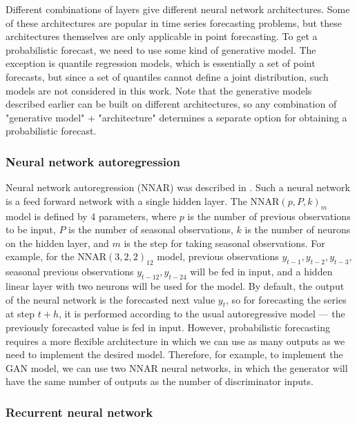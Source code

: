 \documentclass[12pt,a4paper]{article}
\begin{document}
Different combinations of layers give different neural network architectures. Some of these architectures are popular in time series forecasting problems, but these architectures themselves are only applicable in point forecasting. To get a probabilistic forecast, we need to use some kind of generative model. The exception is quantile regression models, which is essentially a set of point forecasts, but since a set of quantiles cannot define a joint distribution, such models are not considered in this work. Note that the generative models described earlier can be built on different architectures, so any combination of "generative model" + "architecture" determines a separate option for obtaining a probabilistic forecast.

\subsubsection{Neural network autoregression}

Neural network autoregression (NNAR) was described in \cite{fpp3}. Such a neural network is a feed forward network with a single hidden layer. The $\text{NNAR}(p,P,k)_m$ model is defined by 4 parameters, where $p$ is the number of previous observations to be input, $P$ is the number of seasonal observations, $k$ is the number of neurons on the hidden layer, and $m$ is the step for taking seasonal observations. For example, for the $\text{NNAR}(3, 2, 2)_{12}$ model, previous observations $y_{t-1}, y_{t-2}, y_{t-3}$, seasonal previous observations $y_{t-12}, y_{t-24}$ will be fed in input, and a hidden linear layer with two neurons will be used for the model. By default, the output of the neural network is the forecasted next value $y_t$, so for forecasting the series at step $t+h$, it is performed according to the usual autoregressive model — the previously forecasted value is fed in input. However, probabilistic forecasting requires a more flexible architecture in which we can use as many outputs as we need to implement the desired model. Therefore, for example, to implement the GAN model, we can use two NNAR neural networks, in which the generator will have the same number of outputs as the number of discriminator inputs.

\subsubsection{Recurrent neural network}
\end{document}
